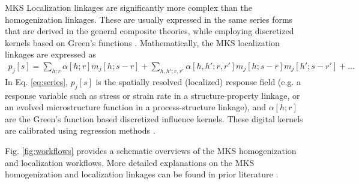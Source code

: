 \documentclass{bmcart}
\begin{document}
MKS Localization linkages are significantly more complex than the
homogenization linkages. These are usually expressed in the same
series forms that are derived in the general composite theories, while
employing discretized kernels based on Green's functions
\cite{brown1955solid, hill1963elastic, kroner1986statistical,
  kroner1977bounds, kroner1972statistical, etingof1993representations,
  adams1998mesostructure, fullwood2008strong, torquato2013random,
  li2006quantitative, milhans2011prediction, adams2013microstructure,
  garmestani2001statistical}. Mathematically, the MKS localization
linkages are expressed as
\begin{multline}
    \label{eq:series}
    p_j[s] = \sum_{h; r} \alpha[h; r] m_j[h; s - r] + \sum_{h, h'; r, r'}
    \alpha[h, h'; r, r'] m_j[h; s - r] m_j[h'; s - r'] + ...
\end{multline}
In Eq. \ref{eq:series}, $p_j[s]$ is the spatially resolved (localized)
response field (e.g. a response variable such as stress or strain
rate in a structure-property linkage, or an evolved microstructure
function in a process-structure linkage), and $\alpha[h; r]$ are
the Green's function based discretized influence kernels. These
digital kernels are calibrated using regression methods
\cite{al2012multi, kalidindi2010novel, landi2010multi,
  yabansu2014calibrated, yabansu2015representation,
  brough2016microstructure}.

Fig. \ref{fig:workflows} provides a schematic overviews of
the MKS homogenization and localization workflows. More detailed
explanations on the MKS homogenization and localization linkages
can be found in prior literature \cite{landi2010multi, kalidindi2010novel,
yabansu2014calibrated, al2012multi, kalidindi2011microstructure,
gupta2015structure, brough2016microstructure, cceccen2014data,
niezgoda2013novel, niezgoda2011understanding, cecen2016versatile}.
\end{document}
